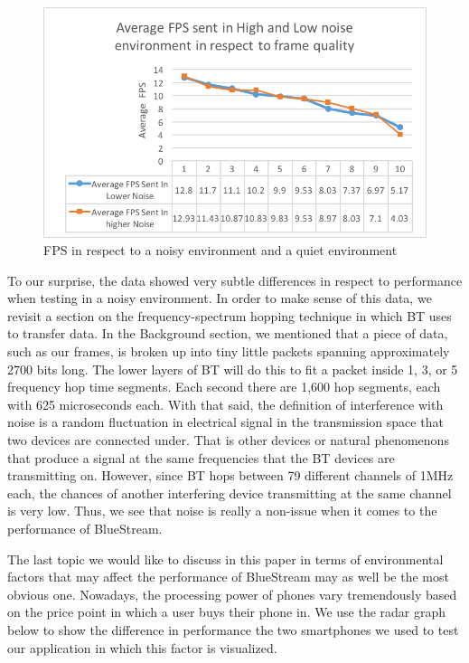 \documentclass[a4paper,12pt]{article}
\begin{document}
\begin{figure}[h!]
\centering
\includegraphics[scale=1]{Figures/Figure17.png}
\caption{FPS in respect to a noisy environment and a quiet environment}
\label{fig:FPSinNoisy}
\end{figure}

To our surprise, the data showed very subtle differences in respect to performance when testing in a noisy environment. In order to make sense of this data, we revisit a section on the frequency-spectrum hopping technique in which BT uses to transfer data. In the Background section, we mentioned that a piece of data, such as our frames, is broken up into tiny little packets spanning approximately 2700 bits long. The lower layers of BT will do this to fit a packet inside 1, 3, or 5 frequency hop time segments. Each second there are 1,600 hop segments, each with 625 microseconds each. With that said, the definition of interference with noise is a random fluctuation in electrical signal in the transmission space that two devices are connected under. That is other devices or natural phenomenons that produce a signal at the same frequencies that the BT devices are transmitting on. However, since BT hops between 79 different channels of 1MHz each, the chances of another interfering device transmitting at the same channel is very low. Thus, we see that noise is really a non-issue when it comes to the performance of BlueStream. 

The last topic we would like to discuss in this paper in terms of environmental factors that may affect the performance of BlueStream may as well be the most obvious one. Nowadays, the processing power of phones vary tremendously based on the price point in which a user buys their phone in. We use the radar graph below to show the difference in performance the two smartphones we used to test our application in which this factor is visualized.
\end{document}
